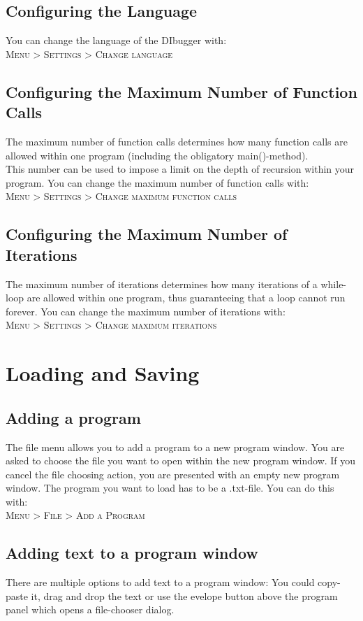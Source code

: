 \documentclass[parskip=full]{memoir}
\begin{document}
\section{Configuring the Language}
You can change the language of the DIbugger with:\\
\textsc{Menu > Settings > Change language}

\section{Configuring the Maximum Number of Function Calls}
The maximum number of function calls determines how many function calls are allowed within one program (including the obligatory main()-method). \\
This number can be used to impose a limit on the depth of recursion within your program.
You can change the maximum number of function calls with:\\
\textsc{Menu > Settings > Change maximum function calls}
\section{Configuring the Maximum Number of Iterations}
The maximum number of iterations determines how many iterations of a while-loop are allowed within one program, thus guaranteeing that a loop cannot run forever.
You can change the maximum number of iterations with: \\
\textsc{Menu > Settings > Change maximum iterations}
\chapter{Loading and Saving} %
\section{Adding a program}
The file menu allows you to add a program to a new program window. You are asked to choose the file you want to open within the new program window. If you cancel the file choosing action, you are presented with an empty new program window. The program you want to load has to be a .txt-file. You can do this with: \\
 \textsc{Menu > File > Add a Program}
 
 \section{Adding text to a program window}
 There are multiple options to add text to a program window: You could copy-paste it, drag and drop the text or use the evelope button above the program panel which opens a file-chooser dialog.
\end{document}
